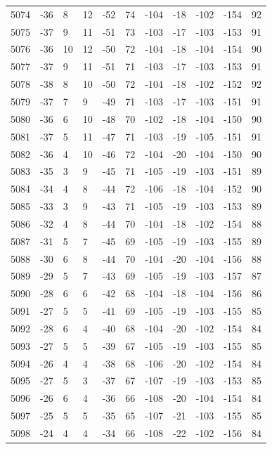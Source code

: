 \begin{table}[H]
\begin{tabular}{lllllllllll}
5074 & -36 & 8 & 12 & -52 & 74 & -104 & -18 & -102 & -154 & 92 \\
5075 & -37 & 9 & 11 & -51 & 73 & -103 & -17 & -103 & -153 & 91 \\
5076 & -36 & 10 & 12 & -50 & 72 & -104 & -18 & -104 & -154 & 90 \\
5077 & -37 & 9 & 11 & -51 & 71 & -103 & -17 & -103 & -153 & 91 \\
5078 & -38 & 8 & 10 & -50 & 72 & -104 & -18 & -102 & -152 & 92 \\
5079 & -37 & 7 & 9 & -49 & 71 & -103 & -17 & -103 & -151 & 91 \\
5080 & -36 & 6 & 10 & -48 & 70 & -102 & -18 & -104 & -150 & 90 \\
5081 & -37 & 5 & 11 & -47 & 71 & -103 & -19 & -105 & -151 & 91 \\
5082 & -36 & 4 & 10 & -46 & 72 & -104 & -20 & -104 & -150 & 90 \\
5083 & -35 & 3 & 9 & -45 & 71 & -105 & -19 & -103 & -151 & 89 \\
5084 & -34 & 4 & 8 & -44 & 72 & -106 & -18 & -104 & -152 & 90 \\
5085 & -33 & 3 & 9 & -43 & 71 & -105 & -19 & -103 & -153 & 89 \\
5086 & -32 & 4 & 8 & -44 & 70 & -104 & -18 & -102 & -154 & 88 \\
5087 & -31 & 5 & 7 & -45 & 69 & -105 & -19 & -103 & -155 & 89 \\
5088 & -30 & 6 & 8 & -44 & 70 & -104 & -20 & -104 & -156 & 88 \\
5089 & -29 & 5 & 7 & -43 & 69 & -105 & -19 & -103 & -157 & 87 \\
5090 & -28 & 6 & 6 & -42 & 68 & -104 & -18 & -104 & -156 & 86 \\
5091 & -27 & 5 & 5 & -41 & 69 & -105 & -19 & -103 & -155 & 85 \\
5092 & -28 & 6 & 4 & -40 & 68 & -104 & -20 & -102 & -154 & 84 \\
5093 & -27 & 5 & 5 & -39 & 67 & -105 & -19 & -103 & -155 & 85 \\
5094 & -26 & 4 & 4 & -38 & 68 & -106 & -20 & -102 & -154 & 84 \\
5095 & -27 & 5 & 3 & -37 & 67 & -107 & -19 & -103 & -153 & 85 \\
5096 & -26 & 6 & 4 & -36 & 66 & -108 & -20 & -104 & -154 & 84 \\
5097 & -25 & 5 & 5 & -35 & 65 & -107 & -21 & -103 & -155 & 85 \\
5098 & -24 & 4 & 4 & -34 & 66 & -108 & -22 & -102 & -156 & 84 \\

\end{tabular}
\end{table}
